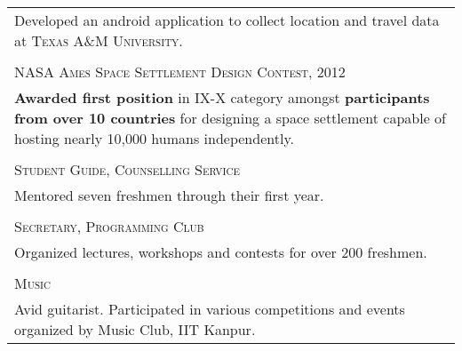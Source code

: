 \documentclass[a4paper,10pt]{article}
\begin{document}
\begin{longtable}{p{16cm}}
Developed an android application to collect location and travel data at \textsc{Texas A\&M University}. \\ \\
\large \textsc{NASA Ames Space Settlement Design Contest, 2012}\\
\textbf{Awarded first position} in IX-X category amongst \textbf{participants from over 10 countries} for designing a space settlement capable of hosting nearly 10,000 humans independently.\\ \\
\large \textsc{Student Guide, Counselling Service}\\
Mentored seven freshmen through their first year.\\ \\
\large \textsc{Secretary, Programming Club}\\
Organized lectures, workshops and contests for over 200 freshmen.
\\ \\
\large \textsc{Music}\\
Avid guitarist. Participated in various competitions and events organized by Music Club, IIT Kanpur.
\end{longtable}
\end{document}

